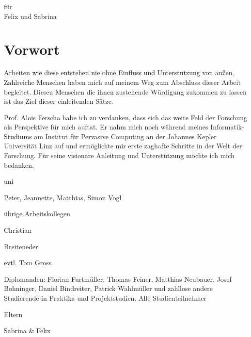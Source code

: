 \vspace*{\fill}

\begin{center}
für \\
Felix und Sabrina
\end{center}

\vspace*{\fill}

\cleardoublepage

\section*{Vorwort} %
\label{sec:vorwort}

Arbeiten wie diese entstehen nie ohne Einfluss und Unterstützung von außen. Zahlreiche Menschen haben mich auf meinem Weg zum Abschluss dieser Arbeit begleitet. Diesen Menschen die ihnen zustehende Würdigung zukommen zu lassen ist das Ziel dieser einleitenden Sätze.

Prof. Alois Ferscha habe ich zu verdanken, dass sich das weite Feld der Forschung als Perspektive für mich auftat. Er nahm mich noch während meines Informatik-Studiums am Institut für Pervasive Computing an der Johannes Kepler Universität Linz auf und ermöglichte mir erste zaghafte Schritte in der Welt der Forschung. Für seine visionäre Anleitung und Unterstützung möchte ich mich bedanken.

uni

Peter, Jeannette, Matthias, Simon Vogl

übrige Arbeitskollegen

Christian

Breiteneder

evtl. Tom Gross

Diplomanden: Florian Furtmüller, Thomas Feiner, Matthias Neubauer, Josef Bohninger, Daniel Bindreiter, Patrick Wahlmüller und zahllose andere Studierende in Praktika und Projektstudien. Alle Studienteilnehmer

Eltern

Sabrina & Felix

